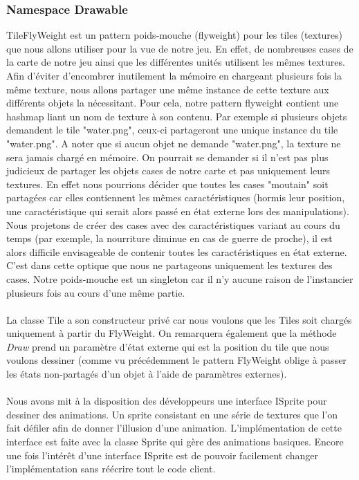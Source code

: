 		\subsubsection{Namespace Drawable} 
			TileFlyWeight est un pattern poids-mouche (flyweight) pour les tiles (textures) que nous allons utiliser pour la vue de notre jeu.
		En effet, de nombreuses cases de la carte de notre jeu ainsi que les différentes unités utilisent les mêmes textures. Afin d'éviter d'encombrer
		inutilement la mémoire en chargeant plusieurs fois la même texture, nous allons partager une même instance de cette texture aux différents objets la nécessitant.
		Pour cela, notre pattern flyweight contient une hashmap liant un nom de texture à son contenu. 
		Par exemple si plusieurs objets demandent le tile "water.png", ceux-ci partageront une unique instance du tile "water.png". 
		A noter que si aucun objet ne demande "water.png", la texture ne sera jamais chargé en mémoire.
			On pourrait se demander si il n'est pas plus judicieux de partager les objets cases de notre carte et pas uniquement leurs textures. 
		En effet nous pourrions décider que toutes les cases "moutain" soit partagées car elles contiennent les mêmes caractéristiques 
		(hormis leur position, une caractéristique qui serait alors passé en état externe lors des manipulations).
			Nous projetons de créer des cases avec des caractéristiques variant au cours du temps (par exemple, la nourriture diminue en cas de guerre de proche), 
		il est alors difficile envisageable de contenir toutes les caractéristiques en état externe. C'est dans cette optique que nous ne partageons uniquement les textures des cases.
		Notre poids-mouche est un singleton car il n'y aucune raison de l'instancier plusieurs fois au cours d'une même partie.
		\paragraph{}
		La classe Tile a son constructeur privé car nous voulons que les Tiles soit chargés uniquement à partir du FlyWeight. 
		On remarquera également que la méthode \textit{Draw} prend un paramètre d'état externe qui est la position du tile que nous voulons dessiner 
		(comme vu précédemment le pattern FlyWeight oblige à passer les états non-partagés d'un objet à l'aide de paramètres externes).
		\paragraph{}
		Nous avons mit à la disposition des développeurs une interface ISprite pour dessiner des animations. Un sprite consistant en une série de textures que l'on fait défiler afin de donner l'illusion 
		d'une animation. L'implémentation de cette interface est faite avec la classe Sprite qui gère des animations basiques. Encore une fois l'intérêt d'une interface ISprite est de pouvoir facilement changer l'implémentation
		sans réécrire tout le code client.
